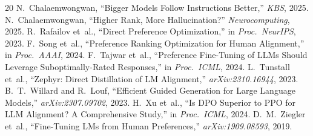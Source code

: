 \documentclass[journal]{IEEEtran}
\begin{document}
\begin{thebibliography}{20}
 N.~Chalaemwongwan, ``Bigger Models Follow Instructions Better,'' \emph{KBS}, 2025.
 N.~Chalaemwongwan, ``Higher Rank, More Hallucination?'' \emph{Neurocomputing}, 2025.
 R.~Rafailov et~al., ``Direct Preference Optimization,'' in \emph{Proc.\ NeurIPS}, 2023.
 F.~Song et~al., ``Preference Ranking Optimization for Human Alignment,'' in \emph{Proc.\ AAAI}, 2024.
 F.~Tajwar et~al., ``Preference Fine-Tuning of LLMs Should Leverage Suboptimally-Rated Responses,'' in \emph{Proc.\ ICML}, 2024.
 L.~Tunstall et~al., ``Zephyr: Direct Distillation of LM Alignment,'' \emph{arXiv:2310.16944}, 2023.
 B.~T.~Willard and R.~Louf, ``Efficient Guided Generation for Large Language Models,'' \emph{arXiv:2307.09702}, 2023.
 H.~Xu et~al., ``Is DPO Superior to PPO for LLM Alignment? A Comprehensive Study,'' in \emph{Proc.\ ICML}, 2024.
 D.~M.~Ziegler et~al., ``Fine-Tuning LMs from Human Preferences,'' \emph{arXiv:1909.08593}, 2019.
\end{thebibliography}
\end{document}

